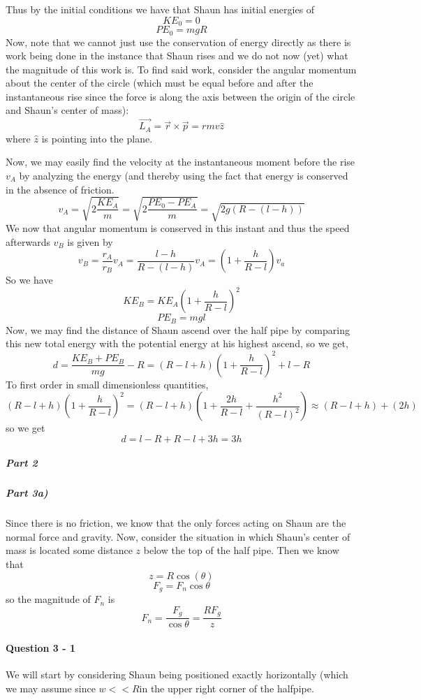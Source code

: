 Thus by the initial conditions we have that Shaun has initial energies of
\[ KE_0 = 0 \]
\[ PE_0 = mgR \]
Now, note that we cannot just use the conservation of energy directly as there is work being done in the instance that Shaun rises and we do not now (yet) what the magnitude of this work is. To find said work, consider the angular momentum about the center of the circle (which must be equal before and after the instantaneous rise since the force is along the axis between the origin of the circle and Shaun's center of mass):
\[ \vec{L_A} = \vec r \times \vec p = rmv \hat{z} \]
where $\hat{z}$ is pointing into the plane. \par
Now, we may easily find the velocity at the instantaneous moment before the rise $v_A$ by analyzing the energy (and thereby using the fact that energy is conserved in the absence of friction.
\[ v_A=\sqrt{2\frac{KE_A}{m}} = \sqrt{2\frac{PE_0-PE_A}{m}} = \sqrt{2g(R-(l-h))}  \]
We now that angular momentum is conserved in this instant and thus the speed afterwards $v_B$ is given by
\[ v_B = \frac{r_A}{r_B} v_A = \frac{l-h}{R-(l-h)} v_A = \left(1+\frac{h}{R-l}\right) v_a \]
So we have
\[ KE_B = KE_A\left(1+\frac{h}{R-l}\right)^2 \]
\[ PE_B = mgl \]
Now, we may find the distance of Shaun ascend over the half pipe by comparing this new total energy with the potential energy at his highest ascend, so we get, 
\[ d=\frac{KE_B+PE_B}{mg}-R = \left(R-l+h\right)\left(1+\frac{h}{R-l}\right)^2+l-R\]
To first order in small dimensionless quantities, 
\[ \left(R-l+h\right)\left(1+\frac{h}{R-l}\right)^2 = \left(R-l+h\right) \left(1+\frac{2h}{R-l}+\frac{h^2}{(R-l)^2}\right) \approx (R-l+h)+(2h) \]
so we get
\[ d = l-R + R - l + 3h =3h \]
\subparagraph{Part 2}


\subparagraph{Part 3a)}
Since there is no friction, we know that the only forces acting on Shaun are the normal force and gravity. Now, consider the situation in which Shaun's center of mass is located some distance $z$ below the top of the half pipe. Then we know that
\[ z=R\cos(\theta) \]
\[ F_g = F_n\cos\theta \] 
so the magnitude of $F_n$ is 
\[ F_n = \frac{F_g}{\cos\theta} = \frac{RF_g}{z} \]



\paragraph{Question 3 - 1}
We will start by considering Shaun being positioned exactly horizontally (which we may assume since $w << R$in the upper right corner of the halfpipe.

